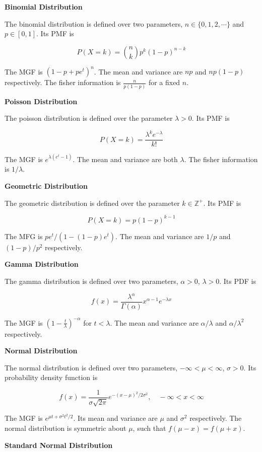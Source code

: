 \documentclass[a4paper]{article}
\newcommand{\subheading}[1]{{\scriptsize\textbf{#1}}}
\begin{document}
\begin{multicols*}{4}
\subheading{Binomial Distribution}

The binomial distribution is defined over two parameters, $n \in \{0, 1, 2,
\cdots\}$ and $p \in [0, 1]$. Its PMF is

$$P(X=k) = \binom{n}{k}p^k(1-p)^{n-k}$$

The MGF is $(1-p+pe^t)^n$. The mean and variance are $np$ and $np(1-p)$
respectively. The fisher information is $\frac{n}{p(1-p)}$ for a fixed $n$.
\smallskip

\subheading{Poisson Distribution}

The poisson distribution is defined over the parameter $\lambda >0$. Its PMF is

$$P(X=k) = \frac{\lambda^k e^{-\lambda}}{k!}$$

The MGF is $e^{\lambda(e^t - 1)}$. The mean and variance are both $\lambda$. The
fisher information is $1/\lambda$. \smallskip

\subheading{Geometric Distribution}

The geometric distribution is defined over the parameter $k \in \mathbb{Z}^+$.
Its PMF is

$$P(X=k) = p(1-p)^{k-1}$$

The MFG is $pe^t/(1 - (1-p)e^t)$. The mean and variance are $1/p$ and
$(1-p)/p^2$ respectively. \smallskip

\subheading{Gamma Distribution}

The gamma distribution is defined over two parameters, $\alpha > 0$, $\lambda >
0$. Its PDF is

$$f(x) = \frac{\lambda^\alpha}{\Gamma(\alpha)} x^{\alpha-1} e^{-\lambda x}$$

The MGF is $\left ( 1 - \frac{t}{\lambda} \right )^{-\alpha}$ for $t < \lambda$.
The mean and variance are $\alpha / \lambda$ and $\alpha / \lambda^2$
respectively. \smallskip

\subheading{Normal Distribution}

The normal distribution is defined over two parameters, $-\infty < \mu <
\infty$, $\sigma > 0$. Its probability density function is

$$f(x) = \frac{1}{\sigma\sqrt{2\pi}} e^{-(x-\mu)^2 / 2\sigma^2},
  \quad -\infty < x < \infty$$

The MGF is $e^{\mu t + \sigma^2 t^2 / 2}$. Its mean and variance are $\mu$ and
$\sigma^2$ respectively. The normal distribution is symmetric about $\mu$, such
that $f(\mu - x) = f(\mu + x)$. \smallskip

\subheading{Standard Normal Distribution}


\end{multicols*}
\end{document}
